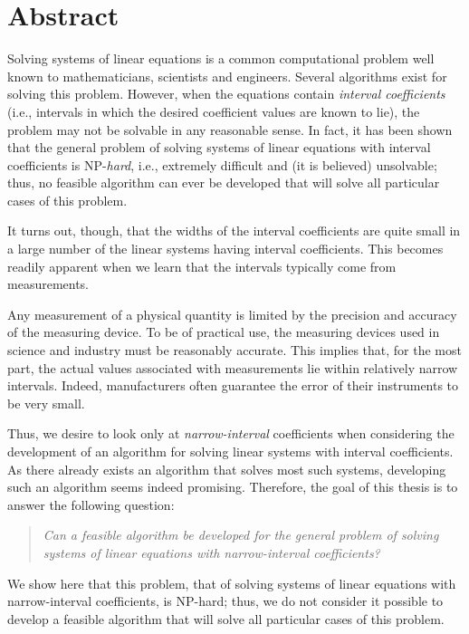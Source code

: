 

\chapter*{Abstract}
Solving systems of linear equations is a common computational problem well
known to mathematicians, scientists and engineers.  Several algorithms exist 
for solving this problem.  However, when the equations contain {\it interval 
coefficients\/} (i.e., intervals in which the desired coefficient values are 
known to lie), the problem may not be solvable in any reasonable sense.  In 
fact, it has been shown that the general problem of solving systems of linear 
equations with interval coefficients is NP-{\it hard}, i.e., extremely difficult
and (it is believed) unsolvable; thus, no feasible algorithm can ever be 
developed that will solve all particular cases of this problem.

It turns out, though, that the widths of the interval coefficients are quite 
small in a large number of the linear systems having interval coefficients.  
This becomes readily apparent when we learn that the intervals typically come 
from measurements.

Any measurement of a physical quantity is limited
by the precision and accuracy of the measuring device.  To be of practical
use, the measuring devices used in science and industry must be
reasonably accurate.  This implies that, for the most part, the actual values
associated with measurements lie within relatively narrow intervals.  Indeed,
manufacturers often guarantee the error of their instruments to be very small.

Thus, we desire to look only at {\it narrow-interval\/} coefficients when 
considering the development of an algorithm for solving linear systems with 
interval coefficients.  As there already exists an algorithm that solves 
most such systems, developing such an algorithm seems indeed promising.
Therefore, the goal of this thesis is to answer the following question:

\begin{quote}
{\it Can a feasible algorithm be developed for the general problem of
solving systems of linear equations with narrow-interval coefficients?}
\end{quote}

\noindent
We show here that this problem, that of solving systems of linear 
equations with narrow-interval coefficients, is NP-hard; thus, we do not
consider it possible to develop a feasible algorithm that will solve all 
particular cases of this problem.

